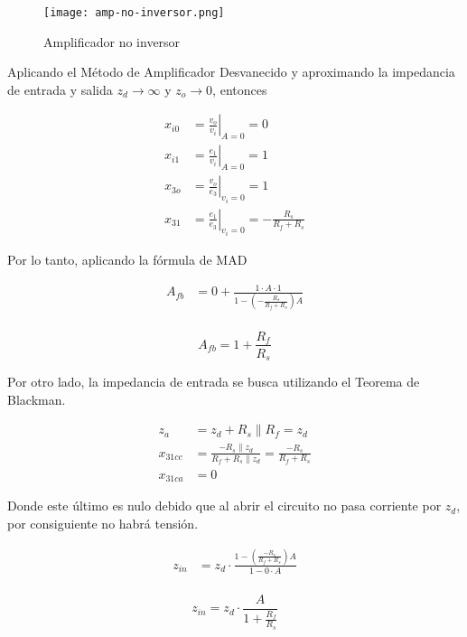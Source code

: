 \begin{figure}[ht]
    \centering
    \texttt{[image: amp-no-inversor.png]}
    \caption{Amplificador no inversor}
    \label{fig:mt-amp-no-inversor}
\end{figure}

Aplicando el Método de Amplificador Desvanecido y aproximando la impedancia de entrada y salida $z_d \rightarrow \infty$ y $z_o \rightarrow 0$, entonces

\begin{align*}
x_{i0} &= \left. \frac{v_o}{v_i} \right|_{A=0} = 0 \\
x_{i1} &= \left. \frac{e_1}{v_i} \right|_{A=0} = 1 \\
x_{3o} &= \left. \frac{v_o}{e_3} \right|_{v_i=0} = 1 \\
x_{31} &= \left. \frac{e_1}{e_3} \right|_{v_i=0} = -\frac{R_s}{R_f + R_s}
\end{align*}


Por lo tanto, aplicando la fórmula de MAD

\begin{align*}
A_{fb} &= 0 + \frac{1 \cdot A \cdot 1}{1 - \left( -\frac{R_s}{R_f + R_s} \right) A} \\
\end{align*}

\begin{equation}
    \boxed{A_{fb} = 1 + \frac{R_f}{R_s}}
    \label{eq:mt-ganancia-amp-no-inversor}
\end{equation}

Por otro lado, la impedancia de entrada se busca utilizando el Teorema de Blackman.

\begin{align*}
z_a &= z_d + R_s \parallel R_f = z_d \\
x_{31cc} &= \frac{-R_s \parallel z_d}{R_f + R_s \parallel z_d} = \frac{-R_s}{R_f + R_s} \\
x_{31ca} &= 0
\end{align*}

Donde este último es nulo debido que al abrir el circuito no pasa corriente por $z_d$, por consiguiente no habrá tensión.

\begin{align*}
z_{in} &= z_d \cdot \frac{1 - \left( \frac{-R_s}{R_f + R_s} \right) A}{1 - 0 \cdot A} \\
\end{align*}

\begin{equation}
    \boxed{z_{in} = z_d \cdot \frac{ A}{1 + \frac{R_f}{R_s}}}
\end{equation}


